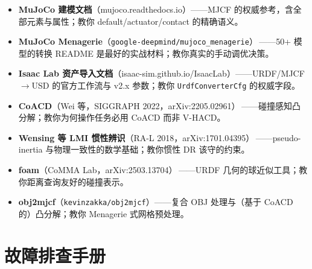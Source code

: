 \begin{itemize}
  \item \textbf{MuJoCo 建模文档}（mujoco.readthedocs.io）——MJCF 的权威参考，含全部元素与属性；教你 default/actuator/contact 的精确语义。
  \item \textbf{MuJoCo Menagerie}（\texttt{google-deepmind/\allowbreak mujoco\_menagerie}）\,\cite{menagerie2022}——50+ 模型的转换 README 是最好的实战材料；教你真实的手动调优决策。
  \item \textbf{Isaac Lab 资产导入文档}（isaac-sim.github.io/IsaacLab）——URDF/MJCF$\to$USD 的官方工作流与 v2.x 参数；教你 \texttt{UrdfConverterCfg} 的权威字段。
  \item \textbf{CoACD}（Wei 等，SIGGRAPH 2022，arXiv:2205.02961）\,\cite{wei2022coacd}——碰撞感知凸分解；教你为何操作任务必用 CoACD 而非 V-HACD。
  \item \textbf{Wensing 等 LMI 惯性辨识}（RA-L 2018，arXiv:1701.04395）\,\cite{wensing2018lmi}——pseudo-inertia 与物理一致性的数学基础；教你惯性 DR 该守的约束。
  \item \textbf{foam}（CoMMA Lab，arXiv:2503.13704）\,\cite{foam2025}——URDF 几何的球近似工具；教你距离查询友好的碰撞表示。
  \item \textbf{obj2mjcf}（\texttt{kevinzakka/\allowbreak obj2mjcf}）——复合 OBJ 处理与（基于 CoACD 的）凸分解；教你 Menagerie 式网格预处理。
\end{itemize}

\section*{故障排查手册}
\label{sec:rlmc-assets-troubleshoot}

